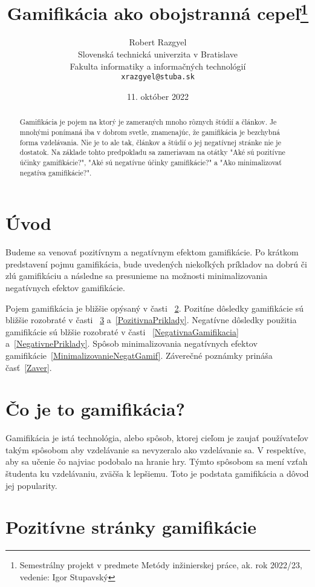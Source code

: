 \documentclass[10pt,twoside,slovak,a4paper]{article}
\title{Gamifikácia ako obojstranná cepeľ\thanks{Semestrálny projekt v predmete Metódy inžinierskej práce, ak. rok 2022/23, vedenie: Igor Stupavský}} %
\author{Robert Razgyel\\[2pt]
	{\small Slovenská technická univerzita v Bratislave}\\
	{\small Fakulta informatiky a informačných technológií}\\
	{\small \texttt{xrazgyel@stuba.sk}}
	}
\date{\small 11. október 2022} %
\begin{document}
\maketitle

\begin{abstract}
Gamifikácia je pojem na ktorý je zameraných mnoho rôznych štúdií a článkov. Je mnohými ponímaná iba v dobrom svetle, znamenajúc, že gamifikácia je bezchybná forma vzdelávania. Nie je to ale tak, článkov a štúdií o jej negatívnej stránke nie je dostatok. Na základe tohto predpokladu sa zameriavam na otátky "Aké sú pozitívne účinky gamifikácie?", "Aké sú negatívne účinky gamifikácie?" a "Ako minimalizovať negatíva gamifikácie?". 
\end{abstract}



\section{Úvod}

Budeme sa venovať pozitívnym a negatívnym efektom gamifikácie. Po krátkom predstavení pojmu gamifikácia, bude uvedených niekoľkých príkladov na dobrú či zlú gamifikáciu a následne sa presunieme na možnosti minimalizovania negatívnych efektov gamifikácie.

Pojem gamifikácia je bližšie opýsaný v časti ~\ref{CoJeGamifikacia}.
Pozitíne dôsledky gamifikácie sú bližšie rozobraté v časti ~\ref{PozitivnaGamifikacia} a~\ref{PozitivnaPriklady}.
Negatívne dôsledky použitia gamifikácie sú blžšie rozobraté v časti ~\ref{NegativnaGamifikacia} a~\ref{NegativnePriklady}.
Spôsob minimalizovania negatívnych efektov gamifikácie~\ref{MinimalizovanieNegatGamif}.
Záverečné poznámky prináša časť~\ref{Zaver}.

\section{Čo je to gamifikácia?} \label{CoJeGamifikacia}

Gamifikácia je istá technológia, alebo spôsob, ktorej cieľom je zaujať používateľov takým spôsobom aby vzdelávanie sa nevyzeralo ako vzdelávanie sa. V respektíve, aby sa učenie čo najviac podobalo na hranie hry. Týmto spôsobom sa mení vzťah študenta ku vzdelávaniu, zväčša k lepšiemu. Toto je podstata gamifikácia a dôvod jej popularity.

\section{Pozitívne stránky gamifikácie} \label{PozitivnaGamifikacia}
\end{document}
